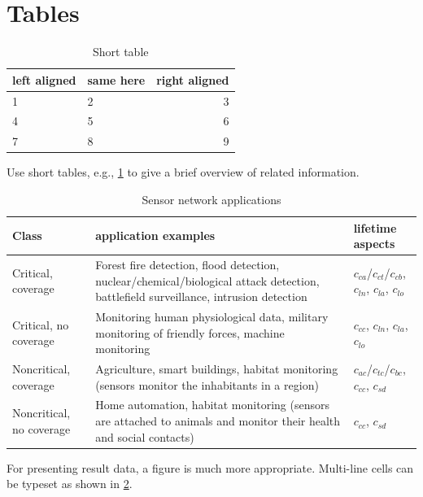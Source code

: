 \documentclass[]{ccs-thesis}
\begin{document}
\clearpage
\section{Tables}

\begin{table}
	\centering
	\begin{tabular}{llr}
		\toprule
		left aligned & same here & right aligned \\
		\midrule
		1 & 2 & 3 \\
		4 & 5 & 6 \\
		7 & 8 & 9 \\
		\bottomrule
	\end{tabular}
	\caption{Short table}
	\label{tab:shorttable}
\end{table}

Use short tables, e.g., \cref{tab:shorttable} to give a brief overview of related information.

\begin{table}
	\centering
	\begin{tabular}{>{\raggedright}p{1.7cm}p{5.4cm}p{3.4cm}}
		\toprule
		Class & application examples & lifetime aspects \\
		\midrule
		Critical, coverage &
				Forest fire detection, flood detection, nuclear/chemical/biological attack detection, battlefield surveillance, intrusion detection &
				$c_{ca}$/$c_{ct}$/$c_{cb}$, $c_{ln}$, $c_{la}$, $c_{lo}$\\
		Critical, no coverage &
				Monitoring human physiological data, military monitoring of friendly forces, machine monitoring &
				$c_{cc}$, $c_{ln}$, $c_{la}$, $c_{lo}$ \\
		Noncritical, coverage &
				Agriculture, smart buildings, habitat monitoring (sensors monitor the inhabitants in a region) &
				$c_{ac}$/$c_{tc}$/$c_{bc}$, $c_{cc}$, $c_{sd}$ \\
		Noncritical, no coverage &
				Home automation, habitat monitoring (sensors are attached to animals and monitor their health and social contacts) &
				$c_{cc}$, $c_{sd}$ \\
		\bottomrule
	\end{tabular}
	\caption{Sensor network applications}
	\label{tab:SensorNetworkApplications}
\end{table}

For presenting result data, a figure is much more appropriate.
Multi-line cells can be typeset as shown in \cref{tab:SensorNetworkApplications}.

\clearpage
\end{document}
